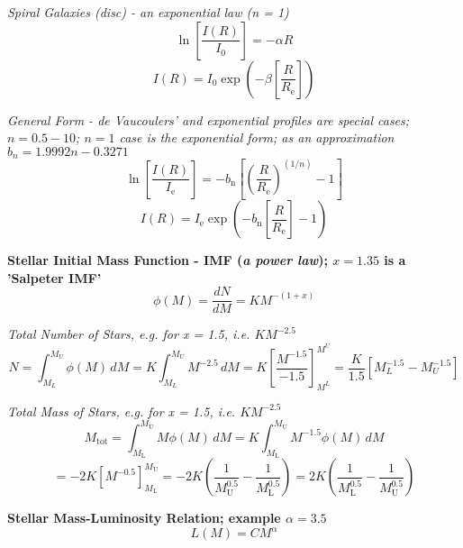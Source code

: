 \documentclass{article}
\begin{document}
\textit {Spiral Galaxies (disc) - an exponential law (n = 1)}
\begin{equation}
\ln \left[ \frac {I(R)}{I_\mathrm{0}} \right] = - \alpha R
\end{equation}
\begin{equation}
I(R) = I_0 \exp\left(-\beta \left[\frac {R}{R_\mathrm{e}} \right]\right)
\end{equation}

\textit {General Form - de Vaucoulers' and exponential profiles are special cases; \(n = 0.5 - 10\); \(n = 1\) case is the exponential form; as an approximation  \(b_n = 1.9992n - 0.3271\)}
\begin{equation}
\ln \left[ \frac {I(R)}{I_\mathrm{e}} \right] = - b_\mathrm{n} \left[ \left( \frac {R}{R_\mathrm{e}} \right)^{(1/n)} - 1 \right]
\end{equation}
\begin{equation}
I(R) = I_\mathrm{e} \exp \left(- b_\mathrm{n} \left[ \frac{R}{R_\mathrm{e}} \right] - 1 \right)
\end{equation}

\textbf {Stellar Initial Mass Function - IMF (\textit {a power law}); \(x = 1.35\) is a 'Salpeter IMF'}
\begin{equation}
\phi (M) = \frac {dN}{dM} = K M^{-(1+x)}
\end{equation}

\textit {Total Number of Stars, e.g. for x = 1.5, i.e. \(KM^{-2.5}\)}
\begin{equation}
N =  \int_{M_L}^{M_U} \phi(M) \,dM
= K \int_{M_L}^{M_U} M^{-2.5} \,dM 
= K \left[ \frac{M^{-1.5}}{-1.5} \right]^{M^U}_{M^L}
= \frac{K}{1.5} \left[M^{-1.5}_L - M^{-1.5}_U \right]
\end{equation}

\textit {Total Mass of Stars, e.g. for x = 1.5, i.e. \(KM^{-2.5}\)}
\begin{equation}
M_\mathrm{tot} =  \int_{M_\mathrm{L}}^{M_\mathrm{U}} M \phi(M) \,dM =  K \int_{M_\mathrm{L}}^{M_\mathrm{U}} M^{-1.5} \phi(M) \,dM
\end{equation}
\begin{equation}
=  -2K \left[M^{-0.5}\right]^{M_\mathrm{U}}_{M_\mathrm{L}} = -2K \left( \frac {1}{M^{0.5}_\mathrm{U}} - \frac {1}{M^{0.5}_\mathrm{L}}\right) = 2K \left( \frac {1}{M^{0.5}_\mathrm{L}} - \frac {1}{M^{0.5}_\mathrm{U}}\right)
\end{equation}


\textbf {Stellar Mass-Luminosity Relation; example \(\alpha = 3.5\)}
\begin{equation}
L (M) = C M^\alpha
\end{equation}
\end{document}
